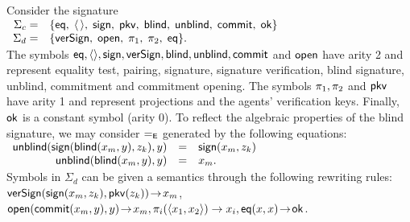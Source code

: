 \begin{example}
\label{ex:term}
Consider the signature\\[0.0mm]
\null\hfill
$\begin{array}{rl}
   \Sigma_c =& \{\mathsf{eq},\; \langle \, \rangle,\; \mathsf{sign},\;\mathsf{pkv},\; \mathsf{blind},\;\mathsf{unblind},\;\mathsf{commit},\; \mathsf{ok}\}\\
   \Sigma_d =& \{\mathsf{verSign},\;\mathsf{open},\; \pi_1, \; \pi_2, \; \mathsf{eq}\}.
 \end{array}$
\hfill\null\\
The symbols $\mathsf{eq},\langle\rangle, \mathsf{sign},\mathsf{verSign},\mathsf{blind},\mathsf{unblind},\mathsf{commit}$ and
	$\mathsf{open}$ have
arity 2 and represent equality test, pairing, signature, signature verification, blind signature, unblind, commitment and
commitment opening. %
The symbols $\pi_1,\pi_2$ and $\mathsf{pkv}$ have arity 1 and represent projections
	and the agents' verification keys.
Finally, $\mathsf{ok}$ is a constant symbol (\ie arity 0).
%
To reflect the algebraic properties of the blind signature, we may
consider $=_{\mathsf{E}}$ generated by the following equations:\\[0.5mm]
\null\hfill$
\begin{array}{rcl}
\mathsf{unblind}(\mathsf{sign}(\mathsf{blind}(x_m,y),z_k),y) &=& \mathsf{sign}(x_m,z_k)\\
\mathsf{unblind}(\mathsf{blind}(x_m,y),y) &=& x_m. \\
\end{array}$\hfill\null\\[0mm]
%
%
Symbols in $\Sigma_d$ 
can be given a semantics through the following rewriting rules: %
$\mathsf{verSign}(\mathsf{sign}(x_m,z_k),\mathsf{pkv}(z_k)) \! \to\! x_m$, 
$\open(\com(x_m,y),y)\! \to\! x_m, 
\proj_i(\langle x_1,x_2\rangle) \to x_i,\linebreak[4]  %
\eq(x,x) \!\to\! \ok$.
\end{example}


